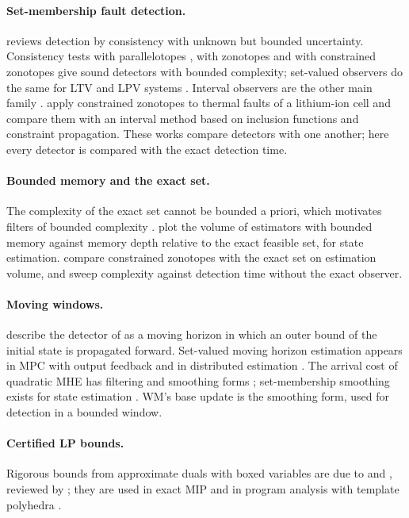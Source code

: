 \documentclass[11pt,a4paper]{article}
\begin{document}
\paragraph{Set-membership fault detection.} \citet{puig2010} reviews detection by consistency with unknown but
bounded uncertainty. Consistency tests with parallelotopes \citep{ingimundarson2005}, with zonotopes
\citep{ingimundarson2009} and with constrained zonotopes \citep{scott2016} give sound detectors with bounded complexity;
set-valued observers do the same for LTV and LPV systems \citep{rosa2010,silvestre2017}. Interval observers are the
other main family \citep{pourasghar2019,tang2019}. \citet{saccani2022} apply constrained zonotopes to thermal faults of a
lithium-ion cell and compare them with an interval method based on inclusion functions and constraint propagation. These works
compare detectors with one another; here every detector is compared with the exact detection time.

\paragraph{Bounded memory and the exact set.} The complexity of the exact set cannot be bounded a priori, which
motivates filters of bounded complexity \citep{sznaier2011,blanchini2012}. \citet{casini2024} plot the volume of
estimators with bounded memory against memory depth relative to the exact feasible set, for state estimation.
\citet{scott2016} compare constrained zonotopes with the exact set on estimation volume, and sweep complexity against
detection time without the exact observer.

\paragraph{Moving windows.} \citet[Sec.~I]{ingimundarson2005} describe the detector of \citet{kesavan2001} as a moving
horizon in which an outer bound of the initial state is propagated forward. Set-valued moving
horizon estimation appears in MPC with output feedback \citep{brunner2018,kohler2021} and in distributed estimation
\citep{segovia2022}. The arrival cost of quadratic MHE has filtering and smoothing forms
\citep{rao2001,haseltine2005}; set-membership smoothing exists for state estimation \citep{garulli1999,li2026}. WM's
base update is the smoothing form, used for detection in a bounded window.

\paragraph{Certified LP bounds.} Rigorous bounds from approximate duals with boxed variables are due to
\citet{neumaier2004} and \citet{jansson2004}, reviewed by \citet{guilbeau2017}; they are used in exact MIP
\citep{cook2013} and in program analysis with template polyhedra \citep{wang2021}.
\end{document}
